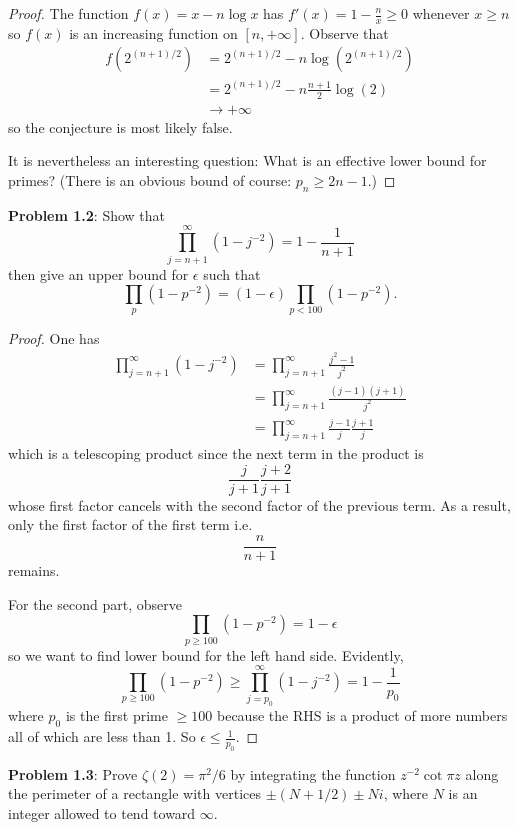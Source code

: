 \documentclass{article}
\begin{document}
\begin{proof}
The function $f(x) = x - n \log x$ has $f'(x) = 1 - \frac{n}{x} \geq 0$ whenever $x \geq n$ so $f(x)$ is an increasing function on $[n, +\infty]$. Observe that
\begin{align*}
f(2^{(n+1)/2}) &= 2^{(n+1)/2} - n \log(2^{(n+1)/2})\\
&= 2^{(n+1)/2} - n \frac{n + 1}{2} \log(2)\\
&\rightarrow +\infty
\end{align*}
so the conjecture is most likely false.

It is nevertheless an interesting question: What is an effective lower bound for primes? (There is an obvious bound of course: $p_n \geq 2n - 1$.)
\end{proof}

\textbf{Problem 1.2}: Show that
$$\prod_{j = n + 1}^{\infty} (1 - j^{-2}) = 1 - \frac{1}{n+1}$$
then give an upper bound for $\epsilon$ such that
$$\prod_p (1 - p^{-2}) = (1 - \epsilon) \prod_{p < 100} (1 - p^{-2}).$$

\begin{proof}
One has
\begin{align*}
\prod_{j = n + 1}^{\infty} (1 - j^{-2}) &= \prod_{j = n + 1}^{\infty} \frac{j^2 - 1}{j^2}\\
&= \prod_{j = n + 1}^{\infty} \frac{(j - 1)(j + 1)}{j^2}\\
&= \prod_{j = n + 1}^{\infty} \frac{j - 1}{j} \frac{j + 1}{j}
\end{align*}
which is a telescoping product since the next term in the product is
$$\frac{j}{j + 1} \frac{j+2}{j+1}$$
whose first factor cancels with the second factor of the previous term. As a result, only the first factor of the first term i.e.
$$\frac{n}{n + 1}$$
remains.

For the second part, observe
$$\prod_{p \geq 100} (1 - p^{-2}) = 1 - \epsilon$$
so we want to find lower bound for the left hand side. Evidently,
$$\prod_{p \geq 100} (1 - p^{-2}) \geq \prod_{j = p_0}^{\infty} (1 - j^{-2}) = 1 - \frac{1}{p_0}$$
where $p_0$ is the first prime $\geq 100$ because the RHS is a product of more numbers all of which are less than 1. So $\epsilon \leq \frac{1}{p_0}$.
\end{proof}

\textbf{Problem 1.3}: Prove $\zeta(2) = \pi^2/6$ by integrating the function $z^{-2} \cot \pi z$ along the perimeter of a rectangle with vertices $\pm (N + 1/2) \pm N i$, where $N$ is an integer allowed to tend toward $\infty$.
\end{document}
